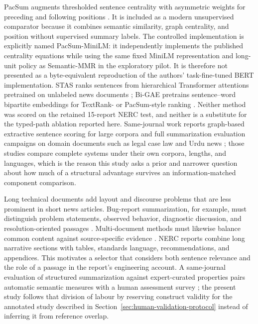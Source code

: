 \documentclass[information,article,submit,moreauthors]{Definitions/mdpi}
\begin{document}
PacSum augments thresholded sentence centrality with asymmetric weights for preceding and following positions \cite{zheng2019pacsum}. It is included as a modern unsupervised comparator because it combines semantic similarity, graph centrality, and position without supervised summary labels. The controlled implementation is explicitly named PacSum-MiniLM: it independently implements the published centrality equations while using the same fixed MiniLM representation and long-unit policy as Semantic-MMR in the exploratory pilot. It is therefore not presented as a byte-equivalent reproduction of the authors' task-fine-tuned BERT implementation. STAS ranks sentences from hierarchical Transformer attentions pretrained on unlabeled news documents \cite{xu2020stas}; Bi-GAE pretrains sentence--word bipartite embeddings for TextRank- or PacSum-style ranking \cite{mao2023bigae}. Neither method was scored on the retained 15-report NERC test, and neither is a substitute for the typed-path ablation reported here. Same-journal work reports graph-based extractive sentence scoring for large corpora \cite{verma2023graph} and full summarization evaluation campaigns on domain documents such as legal case law \cite{koniaris2023legal} and Urdu news \cite{azhar2025urdu}; those studies compare complete systems under their own corpora, lengths, and languages, which is the reason this study asks a prior and narrower question about how much of a structural advantage survives an information-matched component comparison.

Long technical documents add layout and discourse problems that are less prominent in short news articles. Bug-report summarization, for example, must distinguish problem statements, observed behavior, diagnostic discussion, and resolution-oriented passages \cite{koh2022bugreport}. Multi-document methods must likewise balance common content against source-specific evidence \cite{zhang2024tomds}. NERC reports combine long narrative sections with tables, standards language, recommendations, and appendices. This motivates a selector that considers both sentence relevance and the role of a passage in the report's engineering account. A same-journal evaluation of structured summarization against expert-curated properties pairs automatic semantic measures with a human assessment survey \cite{nechakhin2024orkg}; the present study follows that division of labour by reserving construct validity for the annotated study described in Section~\ref{sec:human-validation-protocol} instead of inferring it from reference overlap.
\end{document}
